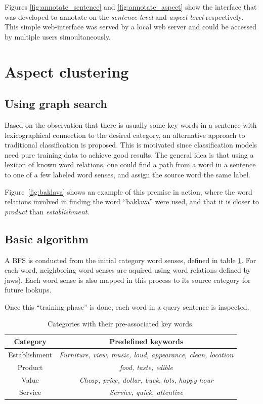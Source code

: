 \documentclass[a4paper,11pt]{kth-mag}
\begin{document}
Figures \ref{fig:annotate_sentence} and \ref{fig:annotate_aspect} show the interface that was developed to annotate on the \emph{sentence level} and \emph{aspect level} respectively. This simple web-interface was served by a local web server and could be accessed by multiple users simoultaneously.

\newpage

\section{Aspect clustering}
\subsection{Using graph search}
Based on the observation that there is usually some key words in a sentence with lexicographical connection to the desired category, an alternative approach to traditional classification is proposed. This is motivated since classification models need pure training data to achieve good results. The general idea is that using a lexicon of known word relations, one could find a path from a word in a sentence to one of a few labeled word senses, and assign the source word the same label.

Figure~\ref{fig:baklava} shows an example of this premise in action, where the word relations involved in finding the word ``baklava'' were used, and that it is closer to \emph{product} than \emph{establishment}.

\subsection{Basic algorithm}
A \gls{BFS} is conducted from the initial category word senses, defined in table \ref{cat_words}. For each word, neighboring word senses are aquired using word relations defined by \gls{jaws}). Each word sense is also mapped in this process to its source category for future lookups.

Once this ``training phase'' is done, each word in a query sentence is inspected.


\begin{table}[t]
  \centering
  \begin{tabular}{| c | c |}
    \hline
    \textbf{Category} & \textbf{Predefined keywords}\\ \hline
    Establishment & \emph{Furniture, view, music, loud, appearance, clean, location}\\ \hline
    Product & \emph{food, taste, edible}\\ \hline
    Value & \emph{Cheap, price, dollar, buck, lots, happy hour}\\ \hline
    Service & \emph{Service, quick, attentive}\\ \hline
  \end{tabular}
  \caption{Categories with their pre-associated key words.}
  \label{cat_words}
\end{table}
\end{document}
